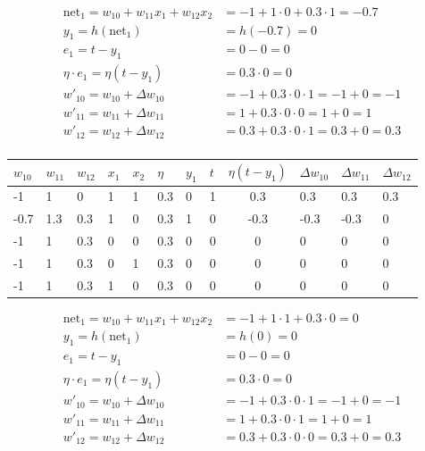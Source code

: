 \documentclass[11pt]{article}
\begin{document}
\begin{align*}
    \text{net}_1 = w_{10} + w_{11}x_1 + w_{12}x_2 &= -1 + 1 \cdot 0 + 0.3 \cdot 1 = -0.7\\
    y_1 = h(\text{net}_1) &= h(-0.7) = 0\\
    e_1 = t - y_1 &= 0 - 0 = 0\\
    \eta \cdot e_1 = \eta (t - y_1) &= 0.3\cdot 0 = 0\\
    w'_{10} = w_{10} + \Delta w_{10} &= -1 + 0.3\cdot 0 \cdot 1 = -1 + 0 = -1\\
    w'_{11} = w_{11} + \Delta w_{11} &= 1 + 0.3\cdot 0 \cdot 0 = 1 + 0 = 1 \\
    w'_{12} = w_{12} + \Delta w_{12} &= 0.3 + 0.3\cdot 0 \cdot 1 = 0.3 + 0 = 0.3 \\
\end{align*}

\begin{tabularx}{\linewidth}{XXXXXXXXcXXX}
    \hline
    $w_{10}$ & $w_{11}$ & $w_{12}$ & $x_1$ & $x_2$ & $\eta$ & $y_1$ & $t$ & $\eta (t-y_1)$ & $\Delta w_{10}$ & $\Delta w_{11}$ & $\Delta w_{12}$\\
    \hline
    -1 & 1 & 0 & 1 & 1 & 0.3 & 0 & 1 & 0.3 & 0.3 & 0.3 & 0.3\\
    \hline
    -0.7 & 1.3 & 0.3 & 1 & 0 & 0.3 & 1 & 0 & -0.3 & -0.3 & -0.3 & 0\\
    \hline
    -1 & 1 & 0.3 & 0 & 0 & 0.3 & 0 & 0 & 0 & 0 & 0 & 0\\
    \hline
    -1 & 1 & 0.3 & 0 & 1 & 0.3 & 0 & 0 & 0 & 0 & 0 & 0\\
    \hline
    -1 & 1 & 0.3 & 1 & 0 & 0.3 & 0 & 0 & 0 & 0 & 0 & 0\\
    \hline
\end{tabularx}

\begin{align*}
\text{net}_1 = w_{10} + w_{11}x_1 + w_{12}x_2 &= -1 + 1 \cdot 1 + 0.3 \cdot 0 = 0\\
y_1 = h(\text{net}_1) &= h(0) = 0\\
e_1 = t - y_1 &= 0 - 0 = 0\\
\eta \cdot e_1 = \eta (t - y_1) &= 0.3\cdot 0 = 0\\
w'_{10} = w_{10} + \Delta w_{10} &= -1 + 0.3\cdot 0 \cdot 1 = -1 + 0 = -1\\
w'_{11} = w_{11} + \Delta w_{11} &= 1 + 0.3\cdot 0 \cdot 1 = 1 + 0 = 1 \\
w'_{12} = w_{12} + \Delta w_{12} &= 0.3 + 0.3\cdot 0 \cdot 0 = 0.3 + 0 = 0.3 \\
\end{align*}
\end{document}
